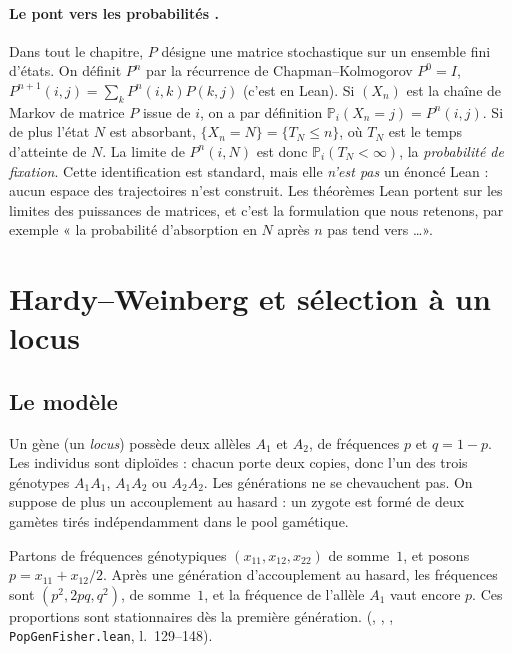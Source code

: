 \paragraph{Le pont vers les probabilités \tierC.} Dans tout le chapitre, $P$ désigne une matrice stochastique
sur un ensemble fini d'états. On définit $P^n$ par la récurrence de Chapman--Kolmogorov $P^0=I$,
$P^{n+1}(i,j)=\sum_kP^n(i,k)P(k,j)$ (c'est  en Lean). Si $(X_n)$ est la chaîne de Markov de matrice
$P$ issue de $i$, on a par définition $\mathbb P_i(X_n=j)=P^n(i,j)$. Si de plus l'état $N$ est absorbant,
$\{X_n=N\}=\{T_N\le n\}$, où $T_N$ est le temps d'atteinte de $N$. La limite de $P^n(i,N)$ est donc
$\mathbb P_i(T_N<\infty)$, la \emph{probabilité de fixation}. Cette identification est standard, mais elle
\emph{n'est pas} un énoncé Lean : aucun espace des trajectoires n'est construit. Les théorèmes Lean portent sur
les limites des puissances de matrices, et c'est la formulation que nous retenons, par exemple « la probabilité
d'absorption en $N$ après $n$ pas tend vers \dots ».

\section{Hardy--Weinberg et sélection à un locus}\label{ch4:sec:hw}

\subsection{Le modèle}
Un gène (un \emph{locus}) possède deux allèles $A_1$ et $A_2$, de fréquences $p$ et $q=1-p$. Les individus sont
diploïdes : chacun porte deux copies, donc l'un des trois génotypes $A_1A_1$, $A_1A_2$ ou $A_2A_2$. Les
générations ne se chevauchent pas. On suppose de plus un accouplement au hasard : un zygote est formé de deux
gamètes tirés indépendamment dans le pool gamétique.

\begin{proposition}\label{ch4:prop:hw}
Partons de fréquences génotypiques $(x_{11},x_{12},x_{22})$ de somme~$1$, et posons $p=x_{11}+x_{12}/2$. Après une
génération d'accouplement au hasard, les fréquences sont $(p^2,2pq,q^2)$, de somme~$1$, et la fréquence de
l'allèle $A_1$ vaut encore $p$. Ces proportions sont stationnaires dès la première génération.
\tierA{} (, , , \texttt{PopGenFisher.lean},
l.~129--148).
\end{proposition}

